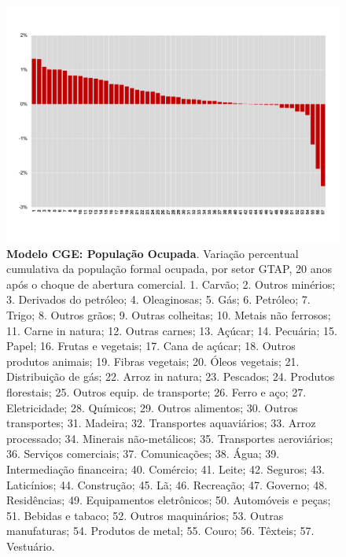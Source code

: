\documentclass{article}
\begin{document}
\newpage
\begin{landscape}
\begin{figure}[htbp!]
    \centering
    \includegraphics[scale=0.8]{mod_estatico_po.pdf}
    \caption[Modelo CGE: População Ocupada]{\textbf{Modelo CGE: População Ocupada}. Variação percentual cumulativa da população formal ocupada, por setor GTAP, 20 anos após o choque de abertura comercial. \scriptsize{1. Carvão; 2. Outros minérios; 3. Derivados do petróleo; 4. Oleaginosas; 5. Gás; 6. Petróleo; 7. Trigo; 8. Outros grãos; 9. Outras colheitas; 10. Metais não ferrosos; 11. Carne in natura; 12. Outras carnes; 13. Açúcar; 14. Pecuária; 15. Papel; 16. Frutas e vegetais; 17. Cana de açúcar; 18. Outros produtos animais; 19. Fibras vegetais; 20. Óleos vegetais; 21. Distribuição de gás; 22. Arroz in natura; 23. Pescados; 24. Produtos florestais; 25. Outros equip. de transporte; 26. Ferro e aço; 27. Eletricidade; 28. Químicos; 29. Outros alimentos; 30. Outros transportes; 31. Madeira; 32. Transportes aquaviários; 33. Arroz processado; 34. Minerais não-metálicos; 35. Transportes aeroviários; 36. Serviços comerciais; 37. Comunicações; 38. Água; 39. Intermediação financeira; 40. Comércio; 41. Leite; 42. Seguros; 43. Laticínios; 44. Construção; 45. Lã; 46. Recreação; 47. Governo; 48. Residências; 49. Equipamentos eletrônicos; 50. Automóveis e peças; 51. Bebidas e tabaco; 52. Outros maquinários; 53. Outras manufaturas; 54. Produtos de metal; 55. Couro; 56. Têxteis; 57. Vestuário.}}
    \label{fig:mod_estatico_po}
\end{figure}
\end{landscape}
\end{document}
